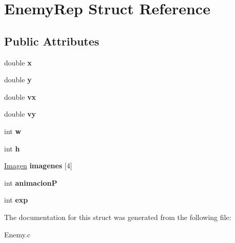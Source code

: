 \hypertarget{struct_enemy_rep}{}\section{Enemy\+Rep Struct Reference}
\label{struct_enemy_rep}
\subsection*{Public Attributes}
\begin{DoxyCompactItemize}
\item 
\mbox{\label{struct_enemy_rep_a20842bf8ad949965dd7e96bd7b2087ac}} 
double {\bfseries x}
\item 
\mbox{\label{struct_enemy_rep_a9efcf7de125c73d11688035d1207fab6}} 
double {\bfseries y}
\item 
\mbox{\label{struct_enemy_rep_a65fe7c7125182b5b747a62fbd197abf7}} 
double {\bfseries vx}
\item 
\mbox{\label{struct_enemy_rep_aa053a49c6b8f66b5cd43a5e0d8a5e6ec}} 
double {\bfseries vy}
\item 
\mbox{\label{struct_enemy_rep_a9fac73c950d4edd474320348ec1f8b38}} 
int {\bfseries w}
\item 
\mbox{\label{struct_enemy_rep_a2ff34c9831ca87da56dca4623f5686ea}} 
int {\bfseries h}
\item 
\mbox{\label{struct_enemy_rep_a3282691afa132afa6af04d4486445392}} 
\mbox{\hyperlink{_pantalla_8h_a768e3409329f2389c63495f1a1684379}{Imagen}} {\bfseries imagenes} \mbox{[}4\mbox{]}
\item 
\mbox{\label{struct_enemy_rep_a34f9f6469dfa82087d5904710b0d9d3a}} 
int {\bfseries animacionP}
\item 
\mbox{\label{struct_enemy_rep_aeca539c029ef010fe94ebb13d2990699}} 
int {\bfseries exp}
\end{DoxyCompactItemize}


The documentation for this struct was generated from the following file\+:\begin{DoxyCompactItemize}
\item 
Enemy.\+c\end{DoxyCompactItemize}
